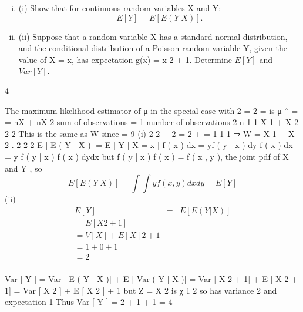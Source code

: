 \documentclass[a4paper,12pt]{article}
\begin{document}
\item 

\begin{enumerate}[(i)]
\item (i) Show that for continuous random variables X and Y:
\[E[Y] = E[E(Y|X)].\]
\item (ii)
Suppose that a random variable X has a standard normal distribution, and the
conditional distribution of a Poisson random variable Y, given the value of
X = x, has expectation g(x) = x 2 + 1.
Determine $E[Y]$ and $Var[Y]$.
\end{enumerate}
4


\newpage
The maximum likelihood estimator of μ in the special case with
 2 =  2 =  is
μ ˆ =
=
nX + nX 2
sum of observations
= 1
number of observations
2 n
1
1
X 1 + X 2
2
2
This is the same as W since
\alpha=
9
(i)
 2
 2
+  2
=
2
\sigma +
=
1
1
1
⇒ W = X 1 + X 2 .
2
2
2
E [ E ( Y | X )] = \int E [ Y | X = x ] f ( x ) dx
= \int \int yf ( y | x ) dy f ( x ) dx
= \int \int y f ( y | x ) f ( x ) dydx
but f ( y | x ) f ( x ) = f ( x , y ), the joint pdf of X and Y , so
\[E [ E ( Y | X )] = \int \int y f ( x , y ) dxdy = E [ Y ]\]
(ii)
\begin{eqnarray*}
E [ Y ] &=& E [ E ( Y | X )] \\
= E [ X 2 + 1]\\
= V [ X ] + { E [ X ]} 2 + 1 \\
= 1 + 0 + 1 \\
= 2\\
\end{eqnarray*}

Var [ Y ] = Var [ E ( Y | X )] + E [ Var ( Y | X )] = Var [ X 2 + 1] + E [ X 2 + 1]
= Var [ X 2 ] + E [ X 2 ] + 1
but Z = X 2 is χ 1 2 so has variance 2 and expectation 1
Thus Var [ Y ] = 2 + 1 + 1 = 4
\end{document}
